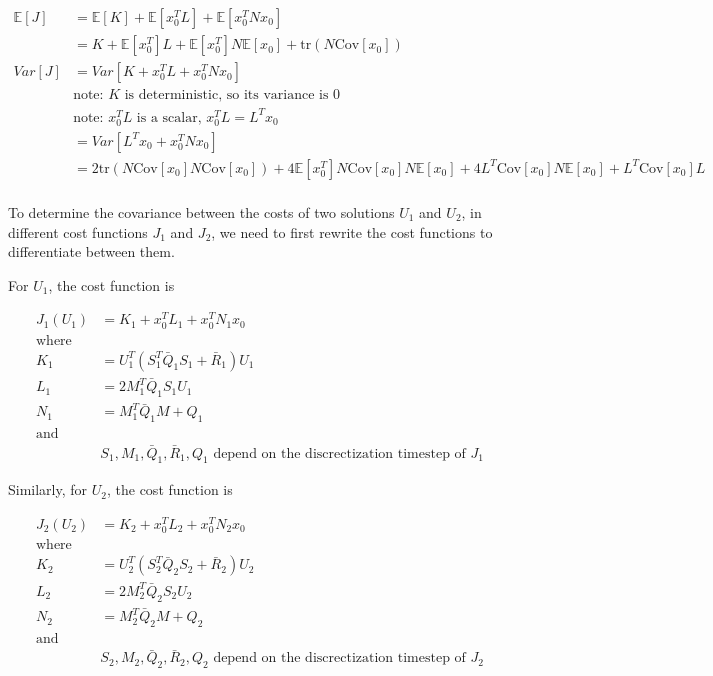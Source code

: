 \documentclass{article}
\begin{document}
\begin{equation}
  \begin{aligned}
    \mathbb{E}[J] &= \mathbb{E}[K] + \mathbb{E}[x_0^T L] + \mathbb{E}[x_0^T N x_0] \\
    &= K + \mathbb{E}[x_0^T] L + \mathbb{E}[x_0^T] N \mathbb{E}[x_0] + \text{tr}(N \text{Cov}[x_0]) \\
    Var[J] &= Var[K + x_0^T L + x_0^T N x_0] \\
    &\text{note: $K$ is deterministic, so its variance is 0} \\
    & \text{note: $x_0^T L$ is a scalar, $x_0^T L = L^T x_0$} \\
    &= Var[L^T x_0 + x_0^T N x_0] \\
    &= 2\text{tr}(N \text{Cov}[x_0] N \text{Cov}[x_0]) + 4 \mathbb{E}[x_0^T]N\text{Cov}[x_0]N\mathbb{E}[x_0] + 4 L^T \text{Cov}[x_0] N \mathbb{E}[x_0] + L^T \text{Cov}[x_0] L \\
  \end{aligned}
\end{equation}

To determine the covariance between the costs of two solutions $U_1$ and $U_2$, in different cost functions
$J_1$ and $J_2$, we need to first rewrite the cost functions to differentiate between them.

For $U_1$, the cost function is

$$
\begin{aligned}
  J_1(U_1) &= K_1 + x_0^T L_1 + x_0^T N_1 x_0 \\
  \text{where} \\
  K_1 &= U_1^T(S_1^T \bar{Q}_1 S_1 + \bar{R}_1) U_1 \\
  L_1 &= 2 M_1^T \bar{Q}_1 S_1 U_1 \\
  N_1 &= M_1^T \bar{Q}_1 M + Q_1 \\
  \text{and} \\
  & S_1, M_1, \bar{Q}_1, \bar{R}_1, Q_1 \text{ depend on the discrectization timestep of } J_1
\end{aligned}
$$

Similarly, for $U_2$, the cost function is

$$
\begin{aligned}
  J_2(U_2) &= K_2 + x_0^T L_2 + x_0^T N_2 x_0 \\
  \text{where} \\
  K_2 &= U_2^T(S_2^T \bar{Q}_2 S_2 + \bar{R}_2) U_2 \\
  L_2 &= 2 M_2^T \bar{Q}_2 S_2 U_2 \\
  N_2 &= M_2^T \bar{Q}_2 M + Q_2 \\
  \text{and} \\
  & S_2, M_2, \bar{Q}_2, \bar{R}_2, Q_2 \text{ depend on the discrectization timestep of } J_2
\end{aligned}
$$
\end{document}
